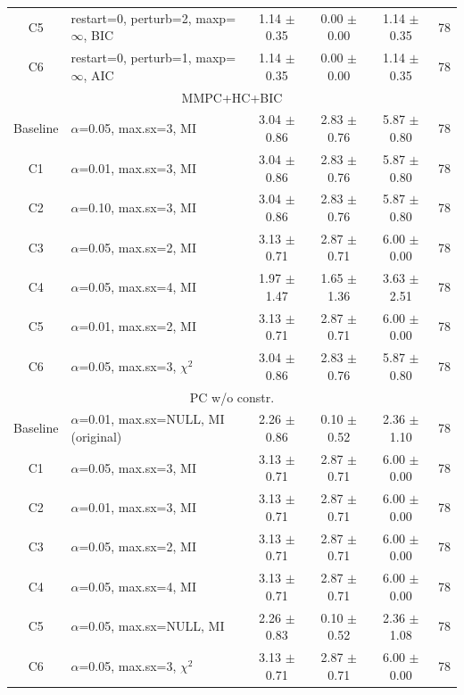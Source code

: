 \begin{table}[!htbp]
{\begin{tabular}{clcccc}
C5 & restart=0, perturb=2, maxp=$\infty$, BIC & 1.14 $\pm$ 0.35 & 0.00 $\pm$ 0.00 & 1.14 $\pm$ 0.35 & 78 \\
C6 & restart=0, perturb=1, maxp=$\infty$, AIC & 1.14 $\pm$ 0.35 & 0.00 $\pm$ 0.00 & 1.14 $\pm$ 0.35 & 78 \\
\midrule
\multicolumn{6}{c}{MMPC+HC+BIC} \\
\midrule
Baseline & $\alpha$=0.05, max.sx=3, MI & 3.04 $\pm$ 0.86 & 2.83 $\pm$ 0.76 & 5.87 $\pm$ 0.80 & 78 \\
C1 & $\alpha$=0.01, max.sx=3, MI & 3.04 $\pm$ 0.86 & 2.83 $\pm$ 0.76 & 5.87 $\pm$ 0.80 & 78 \\
C2 & $\alpha$=0.10, max.sx=3, MI & 3.04 $\pm$ 0.86 & 2.83 $\pm$ 0.76 & 5.87 $\pm$ 0.80 & 78 \\
C3 & $\alpha$=0.05, max.sx=2, MI & 3.13 $\pm$ 0.71 & 2.87 $\pm$ 0.71 & 6.00 $\pm$ 0.00 & 78 \\
C4 & $\alpha$=0.05, max.sx=4, MI & 1.97 $\pm$ 1.47 & 1.65 $\pm$ 1.36 & 3.63 $\pm$ 2.51 & 78 \\
C5 & $\alpha$=0.01, max.sx=2, MI & 3.13 $\pm$ 0.71 & 2.87 $\pm$ 0.71 & 6.00 $\pm$ 0.00 & 78 \\
C6 & $\alpha$=0.05, max.sx=3, $\chi^2$ & 3.04 $\pm$ 0.86 & 2.83 $\pm$ 0.76 & 5.87 $\pm$ 0.80 & 78 \\
\midrule
\multicolumn{6}{c}{PC w/o constr.} \\
\midrule
Baseline & $\alpha$=0.01, max.sx=NULL, MI (original) & 2.26 $\pm$ 0.86 & 0.10 $\pm$ 0.52 & 2.36 $\pm$ 1.10 & 78 \\
C1 & $\alpha$=0.05, max.sx=3, MI & 3.13 $\pm$ 0.71 & 2.87 $\pm$ 0.71 & 6.00 $\pm$ 0.00 & 78 \\
C2 & $\alpha$=0.01, max.sx=3, MI & 3.13 $\pm$ 0.71 & 2.87 $\pm$ 0.71 & 6.00 $\pm$ 0.00 & 78 \\
C3 & $\alpha$=0.05, max.sx=2, MI & 3.13 $\pm$ 0.71 & 2.87 $\pm$ 0.71 & 6.00 $\pm$ 0.00 & 78 \\
C4 & $\alpha$=0.05, max.sx=4, MI & 3.13 $\pm$ 0.71 & 2.87 $\pm$ 0.71 & 6.00 $\pm$ 0.00 & 78 \\
C5 & $\alpha$=0.05, max.sx=NULL, MI & 2.26 $\pm$ 0.83 & 0.10 $\pm$ 0.52 & 2.36 $\pm$ 1.08 & 78 \\
C6 & $\alpha$=0.05, max.sx=3, $\chi^2$ & 3.13 $\pm$ 0.71 & 2.87 $\pm$ 0.71 & 6.00 $\pm$ 0.00 & 78 \\
\bottomrule
\end{tabular}}
\end{table}
